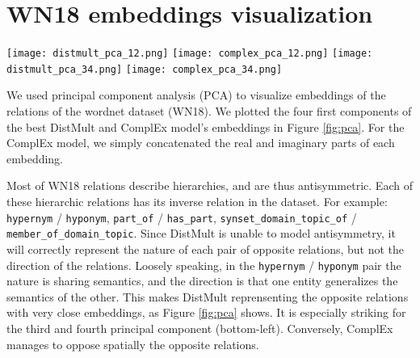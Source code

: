 \documentclass{article}
\begin{document}
\section{WN18 embeddings visualization}
\label{app:wn18_pca}


\begin{figure*}[!ht]\centering
	\texttt{[image: distmult\_pca\_12.png]}
	\texttt{[image: complex\_pca\_12.png]}
	\texttt{[image: distmult\_pca\_34.png]}
	\texttt{[image: complex\_pca\_34.png]}
	\vspace{-5mm}
	\caption{Plots of the first and second (Top), third and fourth (Bottom) components of the WN18 relations embeddings using PCA. Left: DistMult embeddings. Right: ComplEx embeddings. Opposite
	relations are clustered together by DistMult while correctly separated by ComplEx.}
	\label{fig:pca}
\end{figure*}

We used principal component analysis (PCA) to visualize embeddings of the relations 
of the wordnet dataset (WN18). We plotted the four first components of the best DistMult
and ComplEx model's embeddings in Figure \ref{fig:pca}. For the ComplEx model, we simply concatenated
the real and imaginary parts of each embedding. 

Most of WN18 relations describe hierarchies, and are thus antisymmetric.
Each of these hierarchic relations has its inverse relation in the dataset. For example: \texttt{hypernym} / \texttt{hyponym},
\texttt{part\_of} / \texttt{has\_part}, \texttt{synset\_domain\_topic\_of} / \texttt{member\_of\_domain\_topic}.
Since DistMult is unable to model antisymmetry, it will correctly represent the nature
of each pair of opposite relations, but not the direction of the relations.
Loosely speaking, in the \texttt{hypernym} / \texttt{hyponym} pair the nature is 
sharing semantics,
and the direction is that one entity generalizes the semantics of the other. 
This makes DistMult reprensenting the opposite relations with very close embeddings,
as Figure \ref{fig:pca} shows. It is especially striking for the third and
fourth principal component (bottom-left). Conversely, ComplEx manages to oppose spatially
the opposite relations.
\end{document}
